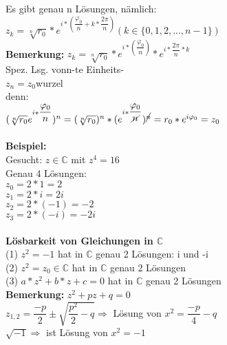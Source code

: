 \documentclass{scrartcl}
\begin{document}
Es gibt genau n Lösungen, nämlich:\\
$z_k=\sqrt[n]{r_0}*e^{i*(\dfrac{\varphi_0}{n}+k*\dfrac{2\pi}{n})}(k\in\{0,1,2,...,n-1\})$\\
\textbf{Bemerkung:} $z_k=\sqrt[n]{r_0}*e^{i*(\dfrac{\varphi_0}{n})}*e^{i*\dfrac{2\pi}{n}*k}
$\\
\hspace*{90pt}Spez. Lsg. von\hspace{15pt}n-te Einheits-\\
\hspace*{105pt} $z_n=z_0$\hspace{30pt}wurzel\\
denn: \\
$(\sqrt[n]{r_0}e^{i*\dfrac{\varphi_0}{n}})^n=(\sqrt[n]{r_0})^n*(e^{i*\dfrac{\varphi_0}{\cancel{n}}})^{\cancel{n}}=r_0*e^{i\varphi_0}=z_0$\\
\\
\textbf{Beispiel:}\\
Gesucht: $z\in\mathbb{C}$ mit $z^4=16$\\
Genau 4 Lösungen:\\
$z_0=2*1=2$\\
$z_1=2*i=2i$\\
$z_2=2*(-1)=-2$\\
$z_3=2*(-i)=-2i$\\
\\
\textbf{Lösbarkeit von Gleichungen in $\mathbb{C}$}\\
(1) $z^2=-1$ hat in $\mathbb{C}$ genau 2 Lösungen: i und -i\\
(2) $z^2=z_0\in\mathbb{C}$ hat in $\mathbb{C}$ genau 2 Lösungen\\
(3) $a*z^2+b*z+c=0$ hat in $\mathbb{C}$ genau 2 Lösungen\\
\textbf{Bemerkung:} $z^2+pz+q=0$\\
$z_{1,2}=\dfrac{-p}{2}\pm \sqrt{\dfrac{p^2}{2}-q}\Rightarrow$ Lösung von $x^2=\dfrac{-p}{4}-q$\\
$\sqrt{-1}\Rightarrow$ ist Lösung von $x^2=-1$\\
\end{document}
